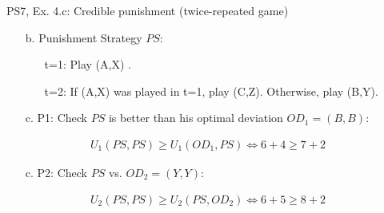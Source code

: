 \begin{frame}{PS7, Ex. 4.c: Credible punishment (twice-repeated game)}
\begin{multicols}{2}
\begin{enumerate}
\begin{itemize}
          \item[t=1:] (A,X) (not a stage game NE)
          \item[t=2:] (C,Z) (a stage game NE)
        \end{itemize}
        \item[b.] Punishment Strategy $PS$:
        \begin{itemize}\normalsize
          \item[t=1:] Play (A,X) .
          \item[t=2:] If (A,X) was played in t=1, play (C,Z). Otherwise, play (B,Y).
        \end{itemize}
        \item[c.] P1: Check $PS$ is better than his optimal deviation $OD_1=(B,B)$:
      \end{enumerate}
      \vspace{-14pt}
      \begin{align*}
          U_1(PS,PS)\geq U_1(OD_1,PS)\Leftrightarrow6+4\geq7+2%
      \end{align*}
      \vspace{-22pt}
      \begin{itemize}
          \item[c.] P2: Check $PS$ vs. $OD_2=(Y,Y)$:
      \end{itemize}
      \vspace{-14pt}
      \begin{align*}
          U_2(PS,PS)\geq U_2(PS,OD_2)\Leftrightarrow6+5\geq8+2%
      \end{align*}
      \vspace{-22pt}
      \vfill\null
    \end{multicols}
\end{frame}
